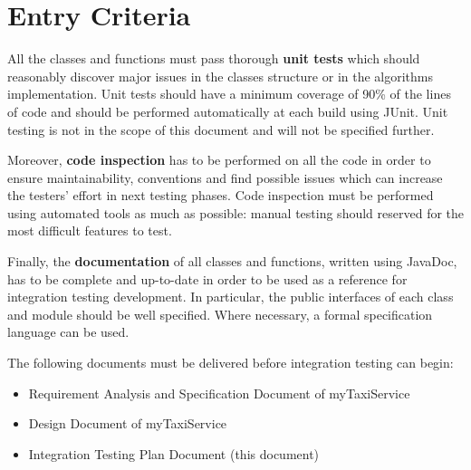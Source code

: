 \section{Entry Criteria}
\label{sec:entry-criteria}

All the classes and functions must pass thorough \textbf{unit tests} which should reasonably discover major issues in the classes structure or in the algorithms implementation. Unit tests should have a minimum coverage of 90\% of the lines of code and should be performed automatically at each build using JUnit. Unit testing is not in the scope of this document and will not be specified further.

Moreover, \textbf{code inspection} has to be performed on all the code in order to ensure maintainability, conventions and find possible issues which can increase the testers' effort in next testing phases. Code inspection must be performed using automated tools as much as possible: manual testing should reserved for the most difficult features to test.

Finally, the \textbf{documentation} of all classes and functions, written using JavaDoc, has to be complete and up-to-date in order to be used as a reference for integration testing development. In particular, the public interfaces of each class and module should be well specified. Where necessary, a formal specification language can be used.

The following documents must be delivered before integration testing can begin:
\begin{itemize}
    \item Requirement Analysis and Specification Document of myTaxiService
    \item Design Document of myTaxiService
    \item Integration Testing Plan Document (this document)
\end{itemize}
